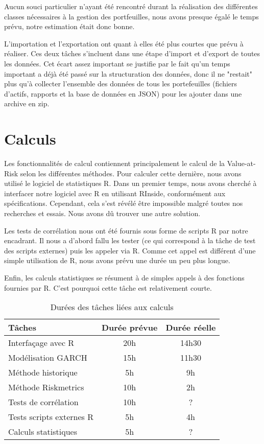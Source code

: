 \documentclass[a4paper]{report}
\begin{document}
Aucun souci particulier n'ayant été rencontré durant la réalisation des différentes classes nécessaires à la gestion des portfeuilles, nous avons presque égalé le temps prévu, notre estimation était donc bonne.

L'importation et l'exportation ont quant à elles été plus courtes que prévu à réaliser. Ces deux tâches s'incluent dans une étape d'import et d'export de toutes les données. 
Cet écart assez important se justifie par le fait qu'un temps important a déjà été passé sur la structuration des données, donc il ne "restait" plus qu'à collecter l'ensemble des données de tous les portefeuilles (fichiers d'actifs, rapports et la base de données en JSON) pour les ajouter dans une archive en zip.

\section{Calculs}
Les fonctionnalités de calcul contiennent principalement le calcul de la Value-at-Risk selon les différentes méthodes. Pour calculer cette dernière, nous avons utilisé le logiciel de statistiques R. Dans un premier temps, nous avons cherché à interfacer notre logiciel avec R en utilisant RInside, conformément aux spécifications. Cependant, cela s'est révélé être impossible malgré toutes nos recherches et essais. Nous avons dû trouver une autre solution.


Les tests de corrélation nous ont été fournis sous forme de scripts R par notre encadrant. Il nous a d'abord fallu les tester (ce qui correspond à la tâche de test des scripts externes) puis les appeler via R. Comme cet appel est différent d'une simple utilisation de R, nous avons prévu une durée un peu plus longue.

Enfin, les calculs statistiques se résument à de simples appels à des fonctions fournies par R. C'est pourquoi cette tâche est relativement courte. 


\begin{table}[H]
\centering
  \begin{tabularx}{0.8\textwidth}{| X | c | c |}
    \hline
	Tâches & Durée prévue & Durée réelle \\
    \hline
    Interfaçage avec R &  20h  & 14h30\\
    Modélisation GARCH &  15h & 11h30\\
    Méthode historique &  5h & 9h\\
    Méthode Riskmetrics &  10h & 2h\\
    Tests de corrélation &  10h & ?\\
    Tests scripts externes R & 5h & 4h\\
    Calculs statistiques &  5h & ?\\
    \hline
  \end{tabularx}
  \caption{Durées des tâches liées aux calculs}
\end{table}
\end{document}
